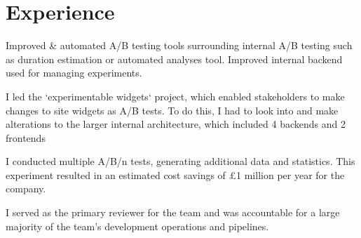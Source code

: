 \documentclass[]{CV}
\begin{document}
%
%


%
%

\begin{minipage}[t]{0.705\textwidth} 



\section{Experience}
\vspace{\topsep} %
\quad
\begin{tightemize}

\item Improved \& automated A/B testing tools surrounding internal A/B testing such as duration estimation or automated analyses tool. Improved internal backend used for managing experiments.

\item I led the `experimentable widgets` project, which enabled stakeholders to make changes to site widgets as A/B tests. To do this, I had to look into and make alterations to the larger internal architecture, which included 4 backends and 2 frontends

\item I conducted multiple A/B/n tests, generating additional data and statistics. This experiment resulted in an estimated cost savings of £1 million per year for the company.

\item I served as the primary reviewer for the team and was accountable for a large majority of the team's development operations and pipelines.


\end{tightemize}
\end{minipage}
\end{document}
